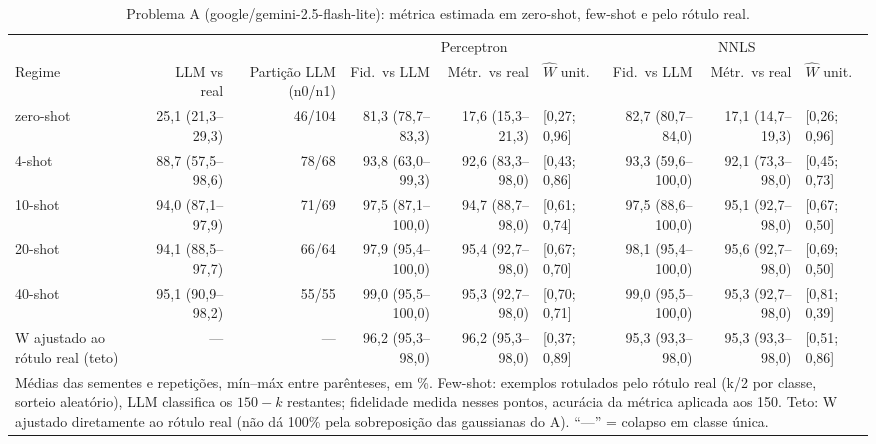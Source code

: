 \begin{table}[htbp]
\centering
\small
\caption{Problema A (google/gemini-2.5-flash-lite): métrica estimada em zero-shot, few-shot e pelo rótulo real.}
\label{tab:T1_A_flashlite}
\begin{tabular}{lrrrrlrrl}
\toprule
 &  &  & \multicolumn{3}{c}{Perceptron} & \multicolumn{3}{c}{NNLS} \\ \cmidrule(lr){4-6} \cmidrule(lr){7-9}
Regime & LLM vs real & Partição LLM (n0/n1) & Fid.\ vs LLM & Métr.\ vs real & $\hat{W}$ unit. & Fid.\ vs LLM & Métr.\ vs real & $\hat{W}$ unit. \\
\midrule
zero-shot & 25,1 (21,3–29,3) & 46/104 & 81,3 (78,7–83,3) & 17,6 (15,3–21,3) & [0,27; 0,96] & 82,7 (80,7–84,0) & 17,1 (14,7–19,3) & [0,26; 0,96] \\
4-shot & 88,7 (57,5–98,6) & 78/68 & 93,8 (63,0–99,3) & 92,6 (83,3–98,0) & [0,43; 0,86] & 93,3 (59,6–100,0) & 92,1 (73,3–98,0) & [0,45; 0,73] \\
10-shot & 94,0 (87,1–97,9) & 71/69 & 97,5 (87,1–100,0) & 94,7 (88,7–98,0) & [0,61; 0,74] & 97,5 (88,6–100,0) & 95,1 (92,7–98,0) & [0,67; 0,50] \\
20-shot & 94,1 (88,5–97,7) & 66/64 & 97,9 (95,4–100,0) & 95,4 (92,7–98,0) & [0,67; 0,70] & 98,1 (95,4–100,0) & 95,6 (92,7–98,0) & [0,69; 0,50] \\
40-shot & 95,1 (90,9–98,2) & 55/55 & 99,0 (95,5–100,0) & 95,3 (92,7–98,0) & [0,70; 0,71] & 99,0 (95,5–100,0) & 95,3 (92,7–98,0) & [0,81; 0,39] \\
\midrule
W ajustado ao rótulo real (teto) & — & — & 96,2 (95,3–98,0) & 96,2 (95,3–98,0) & [0,37; 0,89] & 95,3 (93,3–98,0) & 95,3 (93,3–98,0) & [0,51; 0,86] \\
\bottomrule
\multicolumn{9}{p{0.95\linewidth}}{\footnotesize Médias das sementes e repetições, mín–máx entre parênteses, em \%. Few-shot: exemplos rotulados pelo rótulo real (k/2 por classe, sorteio aleatório), LLM classifica os $150-k$ restantes; fidelidade medida nesses pontos, acurácia da métrica aplicada aos 150. Teto: W ajustado diretamente ao rótulo real (não dá 100\% pela sobreposição das gaussianas do A). ``—'' = colapso em classe única.} \\
\end{tabular}
\end{table}
